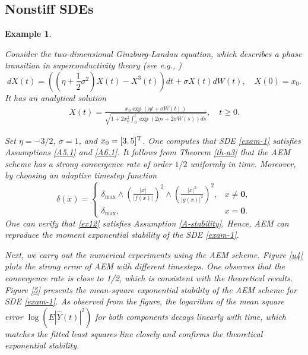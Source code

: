 \documentclass[preprint,12pt,compress]{elsarticle}
\newtheorem{example}{Example}[section]
\begin{document}
\subsection{Nonstiff SDEs}
\begin{example}  \label{ex_a} {\rm 
Consider the two-dimensional Ginzburg-Landau equation, which describes a phase transition in superconductivity theory (see e.g., \cite{ginzburg2009on, kloeden1992numerical, hutzenthaler2015numerical})
\begin{equation}  \label{exam-1}
	dX(t) = \left( {\left( {\eta  + \frac{1}{2}{\sigma ^2}} \right)X(t) - {X^3}(t)} \right)dt + \sigma X(t)dW(t), \quad X(0) = x_0.
\end{equation}
It has an analytical solution
\begin{equation} \label{ex11}
	\begin{split}
		X(t) = \frac{{{x_0}\exp ({\eta}t + {\sigma}W(t))}}{{\sqrt {1 + 2x_0^2\int_0^t {\exp (2{\eta}s + 2{\sigma}W(s))ds} } }}, \quad t \ge 0.
	\end{split}
\end{equation}

Set $\eta = -3/2$, $\sigma = 1$, and $x_0 = [3,5]^{\rm T}$. One computes that SDE \eqref{exam-1} satisfies Assumptions \ref{A5.1} and \ref{A6.1}. It follows from Theorem \ref{th-a3} that the AEM scheme has a strong convergence rate of order $1/2$ uniformly in time. Moreover, by choosing an adaptive timestep function
\begin{equation}  \label{ex12}
	\delta(x)
	=
	\begin{cases}
		\displaystyle
		\delta_{\max}
		\wedge
		\left(\frac{\lvert x\rvert}{\lvert f(x)\rvert}\right)^{2}
		\wedge
		\left(\frac{\lvert x\rvert^{2}}{\lvert g(x)\rvert^{2}}\right)^{2},
		& x\neq \mathbf{0}, \\[1.2ex]
		\delta_{\max},
		& x=\mathbf{0}.
	\end{cases}
\end{equation}
One can verify that  \eqref{ex12} satisfies Assumption \ref{A-stability}. Hence, AEM can reproduce the moment exponential stability of the SDE \eqref{exam-1}.

Next, we carry out the numerical experiments using the AEM scheme.
Figure \ref{u4} plots the strong error of AEM with different timesteps. One observes that the convergence rate is close to 1/2, which is consistent with the theoretical results.
Figure \ref{5} presents the mean-square exponential stability of the AEM scheme for SDE \eqref{exam-1}. As observed from the figure, the logarithm of the mean square error 
$\log (E{| {\hat Y(t)} |^2})$ for both components decays linearly with time, which matches the fitted least squares line closely and confirms the theoretical exponential stability.
 
}
\end{example}
\end{document}
